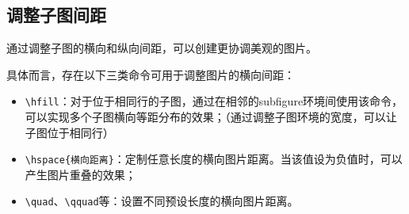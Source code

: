 \subsection{调整子图间距}

通过调整子图的横向和纵向间距，可以创建更协调美观的图片。

具体而言，存在以下三类命令可用于调整图片的横向间距：
\begin{itemize}
    \item \texttt{\textbackslash{}hfill}：对于位于相同行的子图，通过在相邻的subfigure环境间使用该命令，可以实现多个子图横向等距分布的效果；（通过调整子图环境的宽度，可以让子图位于相同行）
    \item \texttt{\textbackslash{}hspace\{横向距离\}}：定制任意长度的横向图片距离。当该值设为负值时，可以产生图片重叠的效果；
    \item \texttt{\textbackslash{}quad}、\texttt{\textbackslash{}qquad}等：设置不同预设长度的横向图片距离。
\end{itemize}

